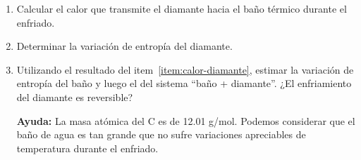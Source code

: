 \documentclass[a4paper,11pt]{article}
\begin{document}
\begin{enumerate}[label=(\alph*),
                  leftmargin=2\parindent,
                  rightmargin=2\parindent]

    \item{\label{item:calor-diamante}
          Calcular el calor que transmite el diamante hacia el baño
          térmico durante el enfriado.}

    \item{Determinar la variación de entropía del diamante.}

    \item{Utilizando el resultado del item~\ref{item:calor-diamante},
          estimar la variación de entropía del baño y luego el del sistema
          ``baño + diamante''. ¿El enfriamiento del diamante es
          reversible?
          }

    {\small
    \textbf{Ayuda:}
    La masa atómica del C es de 12.01 g/mol.
    Podemos considerar que el baño de agua es tan grande que no sufre
    variaciones apreciables de temperatura durante el enfriado.
    }

\end{enumerate}
\end{document}

